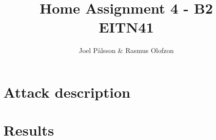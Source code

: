 \documentclass[a4paper]{article}
\title{Home Assignment 4 - B2 \\ EITN41}
\author{Joel Pålsson \& Rasmus Olofzon}
\begin{document}
    \maketitle

    \section{Attack description}
    \section{Results}
\end{document}
